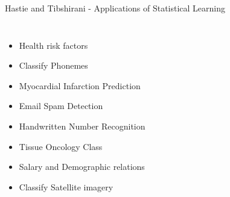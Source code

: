 \documentclass{beamer}
\begin{document}
\begin{frame}[t]{Hastie and Tibshirani - Applications of Statistical Learning}
	\begin{columns}
		\begin{itemize}[<+>]
			\item Health risk factors
			\item Classify Phonemes
			\item Myocardial Infarction Prediction
			\item Email Spam Detection
			\item Handwritten Number Recognition
			\item Tissue Oncology Class
			\item Salary and Demographic relations
			\item Classify Satellite imagery
		\end{itemize}
		\begin{minipage}[c][0.75\textheight][c]{\linewidth}
			\raggedright

\end{minipage}
\end{columns}
\end{frame}
\end{document}

